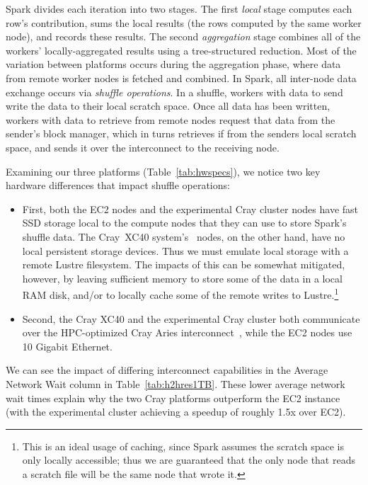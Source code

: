 Spark divides each iteration into two stages.  The first \emph{local}
stage computes each row's contribution, sums the local results (the
rows computed by the same worker node), and records these %
results.  The second \emph{aggregation} stage combines all of the workers' locally-aggregated results using a tree-structured reduction.  Most of the variation between platforms occurs during the aggregation phase, where data from remote worker nodes is fetched and combined.  In Spark, all inter-node data exchange occurs via \emph{shuffle operations}.  In a shuffle, workers with data to send write the data to their local scratch space.  Once all data has been written, workers with data to retrieve from remote nodes request that data from the sender's block manager, which in turns retrieves if from the senders local scratch space, and sends it over the interconnect to the receiving node.

Examining our three platforms (Table~\ref{tab:hwspecs}), we notice two key hardware differences that impact shuffle operations:
\begin{itemize}
\item First, both the EC2 nodes and the experimental Cray cluster nodes have fast SSD storage local to the compute nodes that they can use to store Spark's shuffle data.  
The Cray{\textsuperscript{\tiny\textregistered}}~XC40{\textsuperscript{\tiny\texttrademark}} system's~\cite{alverson2012cray,craycascadesc12} nodes, on the other hand, have no local persistent storage devices.  Thus we must emulate local storage with a remote Lustre filesystem.  The impacts of this can be somewhat mitigated, however, by leaving sufficient memory to store some of the data in a local RAM disk, and/or to locally cache some of the remote writes to Lustre.\footnote{This is an ideal usage of caching, since Spark assumes the scratch space is only locally accessible; thus we are guaranteed that the only node that reads a scratch file will be the same node that wrote it.}
\item Second, the Cray XC40 and the experimental Cray cluster both communicate over the HPC-optimized Cray Aries 
interconnect~\cite{alverson2012cray,craycascadesc12}, while the EC2 nodes use 10 Gigabit Ethernet.
\end{itemize}  
We can see the impact of differing interconnect capabilities in the Average Network Wait column in Table~\ref{tab:h2hres1TB}.   These lower average network wait times explain why the two Cray platforms outperform the EC2 instance (with the experimental cluster achieving a speedup of roughly 1.5x over EC2).  

